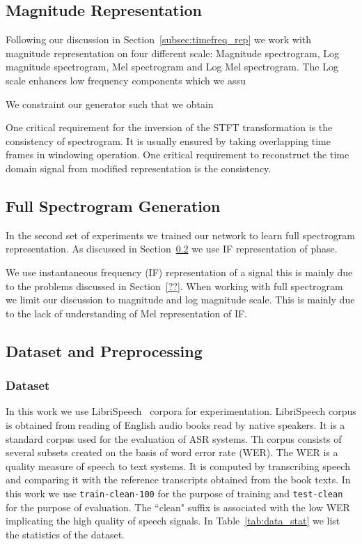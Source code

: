 \subsection{Magnitude Representation}
\label{subsec:mag_gen}
Following our discussion in Section~\ref{subsec:timefreq_rep} we work with magnitude representation on four different scale: Magnitude spectrogram, Log magnitude spectrogram, Mel spectrogram and Log Mel spectrogram. The Log scale enhances low frequency components which we assu


We constraint our generator such that we obtain

One critical requirement for the inversion of the STFT transformation is the consistency of spectrogram. It is usually ensured by taking overlapping time frames  in windowing operation.  
One critical requirement to reconstruct the time domain signal from modified representation is the consistency.



\subsection{Full Spectrogram Generation}
\label{subsec:fsg}
In the second set of experiments we trained our network to learn full spectrogram representation. As discussed in Section~\ref{subsec:fsg} we use IF representation of phase. 

 We use instantaneous frequency (IF) representation of a signal this is mainly due to the problems discussed in Section~\ref{??}. When working with full spectrogram we limit our discussion to magnitude and log magnitude scale. This is mainly due to the lack of understanding of Mel representation of IF. 

\subsection{Dataset and Preprocessing}
\label{subsec:data_step}
\subsubsection{Dataset}
In this work we use LibriSpeech~\cite{panayotov2015librispeech} corpora for experimentation. LibriSpeech corpus is obtained from reading of English audio books read by native speakers. It is a standard corpus used for the evaluation of ASR systems. Th corpus consists of several subsets created on the basis of word error rate (WER). The WER is a quality measure of speech to text systems. It is computed by transcribing speech and comparing it with the
reference transcripts obtained from the book texts. In this work we use \texttt{train-clean-100} for the purpose of training and \texttt{test-clean} for the purpose of evaluation. The ``clean" suffix is associated with the low WER implicating the high quality of speech signals. In Table~\ref{tab:data_stat} we list the statistics of the dataset. 

